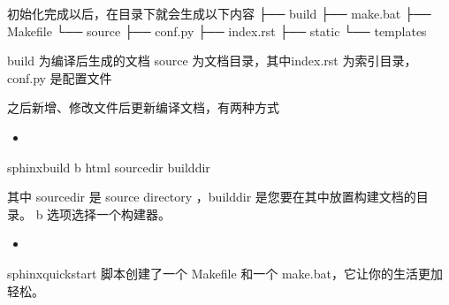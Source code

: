 \documentclass[a4paper,10pt,english]{sphinxmanual}
\begin{document}
\begin{sphinxVerbatim}[commandchars=\\\{\}]
\end{sphinxVerbatim}

\begin{sphinxVerbatim}[commandchars=\\\{\}]
\PYGZsh{} 初始化完成以后，在目录下就会生成以下内容
├── build
├── make.bat
├── Makefile
└── source
    ├── conf.py
    ├── index.rst
    ├── \PYGZus{}static
    └── \PYGZus{}templates

\PYGZsh{} build 为编译后生成的文档
\PYGZsh{} source 为文档目录，其中index.rst 为索引目录，conf.py 是配置文件
\end{sphinxVerbatim}

\sphinxAtStartPar
之后新增、修改文件后更新编译文档，有两种方式
\begin{itemize}
\item {} 
\sphinxAtStartPar
{}

\end{itemize}

\begin{sphinxVerbatim}[commandchars=\\\{\}]
\PYGZdl{} sphinx\PYGZhy{}build \PYGZhy{}b html sourcedir builddir
\end{sphinxVerbatim}

\sphinxAtStartPar
其中 sourcedir 是 source directory ，builddir 是您要在其中放置构建文档的目录。 \sphinxhyphen{}b 选项选择一个构建器。
\begin{itemize}
\item {} 
\sphinxAtStartPar
{}

\end{itemize}

\sphinxAtStartPar
sphinx\sphinxhyphen{}quickstart 脚本创建了一个 Makefile 和一个 make.bat，它让你的生活更加轻松。

\begin{sphinxVerbatim}[commandchars=\\\{\}]
 
\end{sphinxVerbatim}
\end{document}
